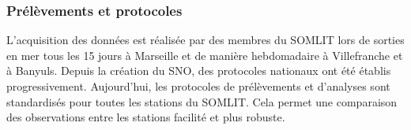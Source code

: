 \documentclass[12pt]{article}
\begin{document}


\subsubsection{Prélèvements et protocoles}

L’acquisition des données est réalisée par des membres du SOMLIT lors de sorties en mer tous les 15 jours à Marseille et de manière hebdomadaire à Villefranche et à Banyuls. Depuis la création du SNO, des protocoles nationaux ont été établis progressivement. Aujourd’hui, les protocoles de prélèvements et d’analyses sont standardisés pour toutes les stations du SOMLIT. Cela permet une comparaison des observations entre les stations facilité et plus robuste. 
\end{document}
